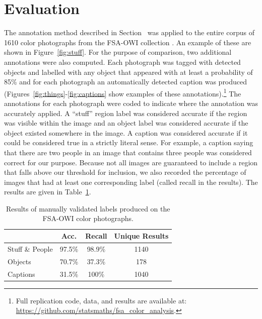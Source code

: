 \documentclass[10pt, a4paper]{article}
\newcommand{\secref}[1]{\StrSubstitute{\getrefnumber{#1}}{.}{ }}
\begin{document}
\section{Evaluation} \label{sec:eval}

The annotation method described in Section~\secref{sec:method} was applied to the
entire corpus of 1610 color photographs from the FSA-OWI collection
\cite{trachtenberg1990reading}. An example of these are shown in
Figure~\ref{fig:stuff}. For the purpose of comparison,
two additional annotations were also computed.
Each photograph was tagged with detected objects and labelled with any object
that appeared with at least a probability of 85\% and for each photograph an
automatically detected caption was produced
(Figures~\ref{fig:things}-\ref{fig:captions} show examples of these
annotations).\footnote{Full replication code, data, and results are
available at: \url{https://github.com/statsmaths/fsa_color_analysis}.}
The annotations for each photograph were coded to indicate where the annotation
was accurately applied. A ``stuff'' region label was considered accurate if the
region was visible within the image and an object label was considered
accurate if the object existed somewhere in the image. A caption was considered
accurate if it could be considered true in a strictly literal sense. For
example, a caption saying that there are two people in an image that contains
three people was considered correct for our purpose. Because not all images
are guaranteed to include a region that falls above our threshold for inclusion,
we also recorded the percentage of images that had at least one
corresponding label (called recall in the results). The results are given in
Table~\ref{tab:results}.

\begin{table}[ht!]
\centering
\begin{tabular}{lccc}
 \hline
 & \textbf{Acc.} & \textbf{Recall} & \textbf{Unique Results} \\
 \hline
Stuff \& People & 97.5\% & 98.9\% & 1140 \\
Objects & 70.7\% & 37.3\% & 178 \\
Captions & 31.5\% & 100\% & 1040 \\
  \hline
\end{tabular}
\caption{Results of manually validated labels produced on the FSA-OWI color
photographs.}
\label{tab:results}
\end{table}
\end{document}
